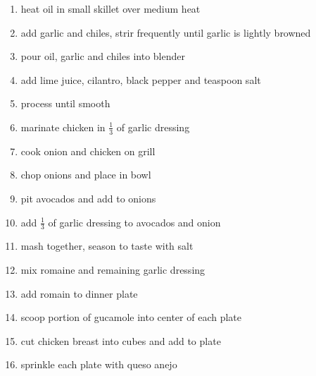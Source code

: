 \documentclass[letter]{recipe}
\begin{document}

\begin{enumerate}
\addtolength{\itemindent}{2em}
 \item heat oil in small skillet over medium heat
 \item add garlic and chiles, strir frequently until garlic is lightly browned
 \item pour oil, garlic and chiles into blender
 \item add lime juice, cilantro, black pepper and teaspoon salt
 \item process until smooth
 \item marinate chicken in $\frac{1}{3}$ of garlic dressing
 \item cook onion and chicken on grill
 \item chop onions and place in bowl
 \item pit avocados and add to onions
 \item add $\frac{1}{3}$ of garlic dressing to avocados and onion
 \item mash together, season to taste with salt
 \item mix romaine and remaining garlic dressing
 \item add romain to dinner plate
 \item scoop portion of gucamole into center of each plate
 \item cut chicken breast into cubes and add to plate
 \item sprinkle each plate with queso anejo
\end{enumerate}
\end{document}
